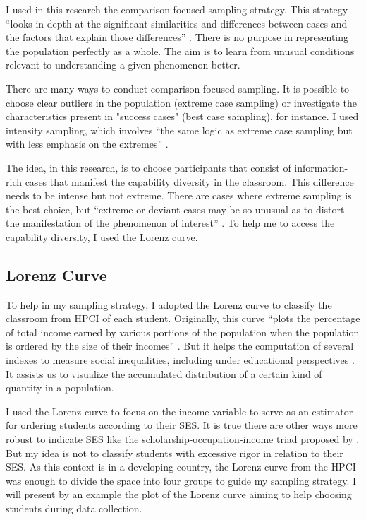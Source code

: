         


I used in this research the comparison-focused sampling strategy. This strategy “looks in depth at the significant similarities and differences between cases and the factors that explain those differences” \cite[p.~418]{patton:2015}. There is no purpose in representing the population perfectly as a whole. The aim is to learn from unusual conditions relevant to understanding a given phenomenon better.

There are many ways to conduct comparison-focused sampling. It is possible to choose clear outliers in the population (extreme case sampling) or investigate the characteristics present in "success cases" (best case sampling), for instance. I used intensity sampling, which involves “the same logic as extreme case sampling but with less emphasis on the extremes” \cite[p.~422]{patton:2015}.

The idea, in this research, is to choose participants that consist of information-rich cases that manifest the capability diversity in the classroom. This difference needs to be intense but not extreme. There are cases where extreme sampling is the best choice, but “extreme or deviant cases may be so unusual as to distort the manifestation of the phenomenon of interest” \cite[p.~422]{patton:2015}. To help me to access the capability diversity, I used the Lorenz curve.

\subsection{Lorenz Curve}
\label{res-meth-ss:lorenz}

To help in my sampling strategy, I adopted the Lorenz curve to classify the classroom from \gls{HPCI} of each student. Originally, this curve “plots the percentage of total income earned by various portions of the population when the population is ordered by the size of their incomes” \cite{gastwirth:1971}. But it helps the computation of several indexes to measure social inequalities, including under educational perspectives \cite{thomas:2003}. It assists us to visualize the accumulated distribution of a certain kind of quantity in a population. 

I used the Lorenz curve to focus on the income variable to serve as an estimator for ordering students according to their \gls{SES}. It is true there are other ways more robust to indicate \gls{SES} like the scholarship-occupation-income triad proposed by . But my idea is not to classify students with excessive rigor in relation to their \gls{SES}. As this context is in a developing country, the Lorenz curve from the \gls{HPCI} was enough to divide the space into four groups to guide my sampling strategy. I will present by an example the plot of the Lorenz curve aiming to help choosing students during data collection.


